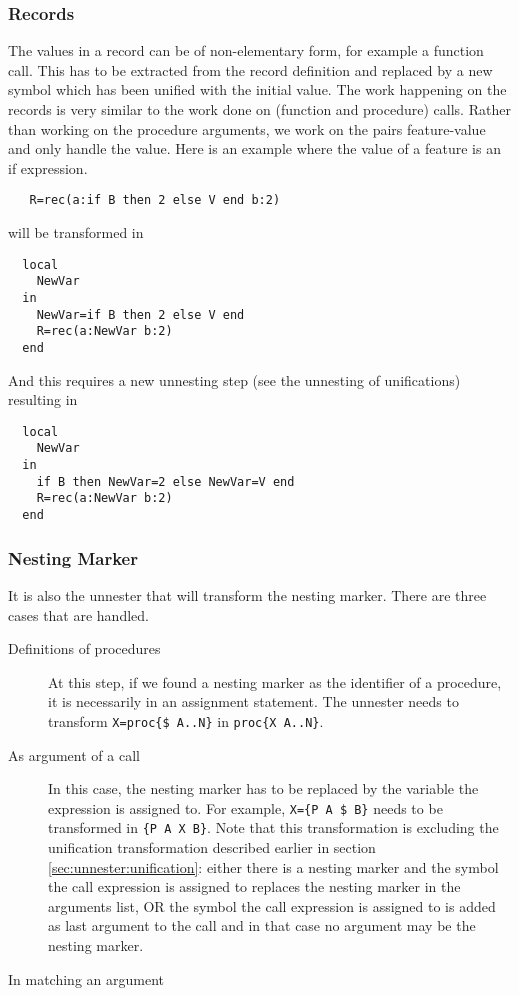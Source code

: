 \documentclass[a4paper]{memoir}
\begin{document}
\subsubsection{Records}
The values in a record can be of non-elementary form, for example a function call. This has to be extracted from the record definition and replaced by a new symbol which has been unified with the initial value. The work happening on the records is very similar to the work done on (function and procedure) calls. Rather than working on the procedure arguments, we work on the pairs feature-value and only handle the value. 
Here is an example where the value of a feature is an if expression.
\begin{lstlisting}
   R=rec(a:if B then 2 else V end b:2)
\end{lstlisting}
will be transformed in
\begin{lstlisting}
  local
    NewVar
  in
    NewVar=if B then 2 else V end
    R=rec(a:NewVar b:2)
  end
\end{lstlisting}
And this requires a new unnesting step (see the unnesting of unifications) resulting in 
\begin{lstlisting}
  local
    NewVar
  in
    if B then NewVar=2 else NewVar=V end
    R=rec(a:NewVar b:2)
  end
\end{lstlisting}



\subsubsection{Nesting Marker}\label{sec:unnester:nestingmarker}
It is also the unnester that will transform the nesting marker. There are three cases that are handled.
\begin{description}
  \item[Definitions of procedures] At this step, if we found a nesting marker as the identifier of a procedure, it is necessarily in an assignment statement. The unnester needs to transform \lstinline!X=proc{$ A..N}! in \lstinline!proc{X A..N}!.
  \item[As argument of a call] In this case, the nesting marker has to be replaced by the variable the expression is assigned to. For example, \lstinline!X={P A $ B}! needs to be transformed in  \lstinline!{P A X B}!. Note that this transformation is excluding the unification transformation described earlier in section \ref{sec:unnester:unification}: either there is a nesting marker and the symbol the call expression is assigned to replaces the nesting marker in the arguments list, OR the symbol the call expression is assigned to is added as last argument to the call and in that case no argument may be the nesting marker.
  \item[In matching an argument] %
\end{description}
\end{document}
